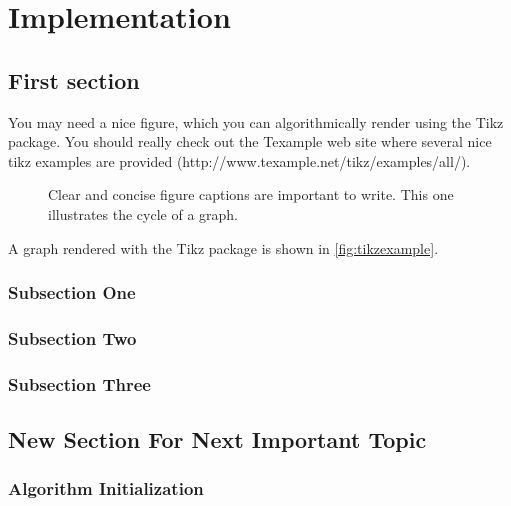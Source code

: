 \chapter{Implementation}
\label{chap:impl}

\section{First section}

You may need a nice figure, which you can algorithmically render using the Tikz package. You should really check out the Texample web site where several nice tikz examples are provided (http://www.texample.net/tikz/examples/all/).

\begin{figure}
\centering
{}
\caption{Clear and concise figure captions are important to write. This one illustrates the cycle of a graph.}
\label{fig:tikzexample}
\end{figure}

A graph rendered with the Tikz package is shown in \autoref{fig:tikzexample}.

\subsection{Subsection One}
\subsection{Subsection Two}
\subsection{Subsection Three}

\section{New Section For Next Important Topic}

\subsection{Algorithm Initialization}
